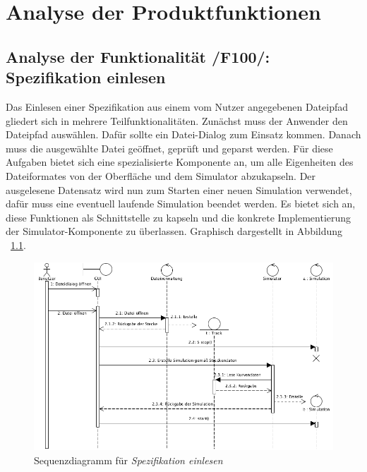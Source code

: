 \chapter{Analyse der Produktfunktionen}

%

\section{Analyse der Funktionalität /F100/: Spezifikation einlesen}
Das Einlesen einer Spezifikation aus einem vom Nutzer angegebenen Dateipfad
gliedert sich in mehrere Teilfunktionalitäten. Zunächst muss der Anwender den
Dateipfad auswählen. Dafür sollte ein Datei-Dialog zum Einsatz kommen.
Danach muss die ausgewählte Datei geöffnet, geprüft und geparst werden. Für
diese Aufgaben bietet sich eine spezialisierte Komponente an, um alle
Eigenheiten des Dateiformates von der Oberfläche und dem Simulator abzukapseln.
Der ausgelesene Datensatz wird nun zum Starten einer neuen Simulation verwendet,
dafür muss eine eventuell laufende Simulation beendet werden. Es bietet sich
an, diese Funktionen als Schnittstelle zu kapseln und die konkrete Implementierung
der Simulator-Komponente zu überlassen. Graphisch dargestellt in Abbildung ~\ref{fig:spezifikation_einlesen}.

\begin{figure}[h!]
\includegraphics[width=\linewidth]{bilder/spezifikation_einlesen}
\caption{Sequenzdiagramm für \textit{Spezifikation einlesen}}
\label{fig:spezifikation_einlesen}
\end{figure}

